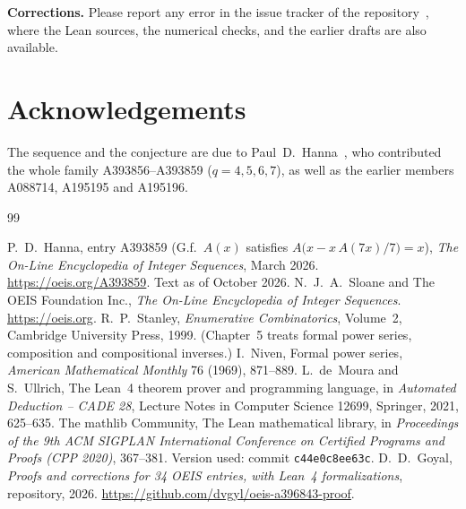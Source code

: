 \documentclass[11pt,a4paper]{article}
\theoremstyle{definition}
\theoremstyle{remark}
\newcommand{\para}[1]{\par\medskip\noindent\textbf{#1}\enspace}
\begin{document}
\para{Corrections.} Please report any error in the issue tracker of the repository~\cite{repo}, where the Lean
sources, the numerical checks, and the earlier drafts are also available.

\section*{Acknowledgements}
The sequence and the conjecture are due to Paul~D.~Hanna~\cite{oeis}, who contributed
the whole family A393856--A393859 ($q=4,5,6,7$), as well as the earlier members A088714, A195195 and A195196.

\begin{thebibliography}{99}\small
\raggedright
{} P.~D.~Hanna, entry A393859 (G.f.\ $A(x)$ satisfies $A\bigl(x-x\,A(7x)/7\bigr)=x$), \emph{The On-Line Encyclopedia of Integer Sequences}, March 2026. \url{https://oeis.org/A393859}. Text as of October 2026.
 N.~J.~A.~Sloane and The OEIS Foundation Inc., \emph{The On-Line Encyclopedia of Integer Sequences}. \url{https://oeis.org}.
 R.~P.~Stanley, \emph{Enumerative Combinatorics}, Volume~2, Cambridge University Press, 1999. (Chapter~5 treats formal power series, composition and compositional inverses.)
 I.~Niven, Formal power series, \emph{American Mathematical Monthly} 76 (1969), 871--889.
 L.~de~Moura and S.~Ullrich, The Lean~4 theorem prover and programming language, in \emph{Automated Deduction -- CADE 28}, Lecture Notes in Computer Science 12699, Springer, 2021, 625--635.
 The mathlib Community, The Lean mathematical library, in \emph{Proceedings of the 9th ACM SIGPLAN International Conference on Certified Programs and Proofs (CPP 2020)}, 367--381. Version used: commit \texttt{c44e0c8ee63c}.
 D.~D.~Goyal, \emph{Proofs and corrections for 34 OEIS entries, with Lean~4 formalizations}, repository, 2026. \url{https://github.com/dvgyl/oeis-a396843-proof}.
\end{thebibliography}
\end{document}
